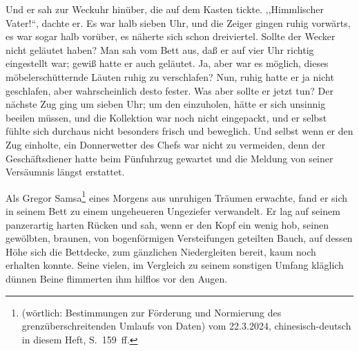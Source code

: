 \documentclass[]{zchinr}
\begin{document}
Und er sah zur Weckuhr hinüber, die auf dem Kasten tickte. ,,Himmlischer Vater!``, dachte er. Es war halb sieben Uhr, und die Zeiger gingen ruhig vorwärts, es war sogar halb vorüber, es näherte sich schon dreiviertel. Sollte der Wecker nicht geläutet haben? Man sah vom Bett aus, daß er auf vier Uhr richtig eingestellt war; gewiß hatte er auch geläutet. Ja, aber war es möglich, dieses möbelerschütternde Läuten ruhig zu verschlafen? Nun, ruhig hatte er ja nicht geschlafen, aber wahrscheinlich desto fester. Was aber sollte er jetzt tun? Der nächste Zug ging um sieben Uhr; um den einzuholen, hätte er sich unsinnig beeilen müssen, und die Kollektion war noch nicht eingepackt, und er selbst fühlte sich durchaus nicht besonders frisch und beweglich. Und selbst wenn er den Zug einholte, ein Donnerwetter des Chefs war nicht zu vermeiden, denn der Geschäftsdiener hatte beim Fünfuhrzug gewartet und die Meldung von seiner Versäumnis längst erstattet. 



\printtitle

Als Gregor Samsa\footnote{ (wörtlich: Bestimmungen zur Förderung und Normierung des grenzüberschreitenden Umlaufs von Daten) vom 22.3.2024, chinesisch-deutsch in diesem Heft, S.~159~ff.} eines Morgens aus unruhigen Träumen erwachte, fand er sich in seinem Bett zu einem ungeheueren Ungeziefer verwandelt. Er lag auf seinem panzerartig harten Rücken und sah, wenn er den Kopf ein wenig hob, seinen gewölbten, braunen, von bogenförmigen Versteifungen geteilten Bauch, auf dessen Höhe sich die Bettdecke, zum gänzlichen Niedergleiten bereit, kaum noch erhalten konnte. Seine vielen, im Vergleich zu seinem sonstigen Umfang kläglich dünnen Beine flimmerten ihm hilflos vor den Augen.



\printtitle

\end{document}
